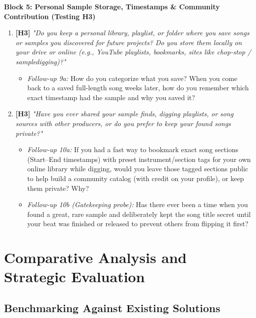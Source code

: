 \vspace{0.3em}
\noindent\textbf{Block 5: Personal Sample Storage, Timestamps \& Community Contribution (Testing H3)}
\begin{enumerate}[resume, leftmargin=*, nosep]
    \item \textbf{[H3]} \textit{"Do you keep a personal library, playlist, or folder where you save songs or samples you discovered for future projects? Do you store them locally on your drive or online (e.g., YouTube playlists, bookmarks, sites like chop-stop / sampledigging)?"}
    \begin{itemize}[leftmargin=1.5cm, nosep]
        \item \textit{Follow-up 9a:} How do you categorize what you save? When you come back to a saved full-length song weeks later, how do you remember which exact timestamp had the sample and why you saved it?
    \end{itemize}
    \item \textbf{[H3]} \textit{"Have you ever shared your sample finds, digging playlists, or song sources with other producers, or do you prefer to keep your found songs private?"}
    \begin{itemize}[leftmargin=1.5cm, nosep]
        \item \textit{Follow-up 10a:} If you had a fast way to bookmark exact song sections (Start--End timestamps) with preset instrument/section tags for your own online library while digging, would you leave those tagged sections public to help build a community catalog (with credit on your profile), or keep them private? Why?
        \item \textit{Follow-up 10b (Gatekeeping probe):} Has there ever been a time when you found a great, rare sample and deliberately kept the song title secret until your beat was finished or released to prevent others from flipping it first?
    \end{itemize}
\end{enumerate}

\section{Comparative Analysis and Strategic Evaluation}

\subsection*{Benchmarking Against Existing Solutions}

